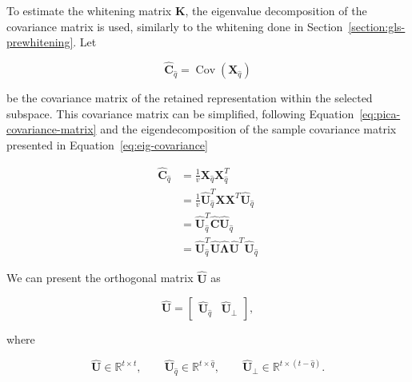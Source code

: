 \documentclass[english]{pwr_wmat_praca_dyplomowa}
\theoremstyle{definition}
\theoremstyle{remark}
\begin{document}
To estimate the whitening matrix $\mathbf{K}$, the eigenvalue decomposition of the covariance matrix is used, similarly to the whitening done in Section~\ref{section:gls-prewhitening}. Let 

\begin{equation}
    \widehat{\mathbf{C}}_{\widehat{q}} = \operatorname{Cov}\left(\mathbf{X}_{\widehat{q}}\right)
\end{equation}

be the covariance matrix of the retained representation within the selected subspace. This covariance matrix can be simplified, following Equation~\eqref{eq:pica-covariance-matrix} and the eigendecomposition of the sample covariance matrix presented in Equation~\eqref{eq:eig-covariance}

\begin{equation}
    \begin{aligned}
        \widehat{\mathbf{C}}_{\widehat{q}}
        &= \frac{1}{v} \mathbf{X}_{\widehat{q}} \mathbf{X}_{\widehat{q}}^T \\
        &= \frac{1}{v} \widehat{\mathbf{U}}_{\widehat{q}}^T \mathbf{X} \mathbf{X}^T \widehat{\mathbf{U}}_{\widehat{q}} \\
        &= \widehat{\mathbf{U}}_{\widehat{q}}^T \widehat{\mathbf{C}} \widehat{\mathbf{U}}_{\widehat{q}} \\
        &= \widehat{\mathbf{U}}_{\widehat{q}}^T \widehat{\mathbf{U}} \widehat{\boldsymbol{\Lambda}} \widehat{\mathbf{U}}^T \widehat{\mathbf{U}}_{\widehat{q}}
    \end{aligned}
    \label{eq:subspace-covariance-matrix}
\end{equation}

We can present the orthogonal matrix $\widehat{\mathbf{U}}$ as 

\begin{equation}
    \widehat{\mathbf{U}} = \begin{bmatrix}\widehat{\mathbf{U}}_{\widehat{q}} & \widehat{\mathbf{U}}_\perp \end{bmatrix},
\end{equation}

where

\begin{equation}
    \widehat{\mathbf{U}} \in \mathbb{R}^{t \times t}, \qquad
    \widehat{\mathbf{U}}_{\widehat{q}} \in \mathbb{R}^{t \times \widehat{q}}, \qquad
    \widehat{\mathbf{U}}_\perp \in \mathbb{R}^{t \times \left(t - \widehat{q}\right)}.
\end{equation}
\end{document}
